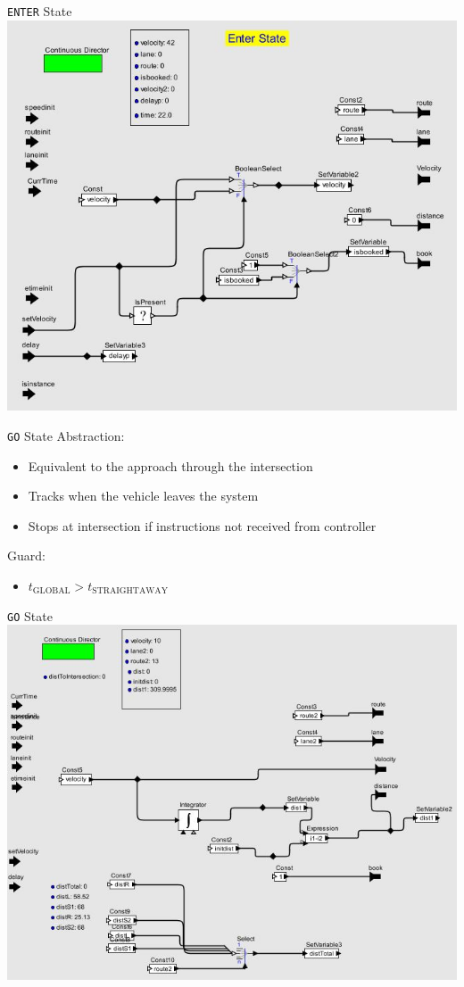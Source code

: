 \begin{frame}{\texttt{ENTER} State}
\centering\includegraphics[width=0.7\linewidth]{diagram/ptolemy_vehicle_enter.jpg}
\end{frame}

\begin{frame}{\texttt{GO} State}
Abstraction:
\begin{itemize}
\item Equivalent to the approach through the intersection
\item Tracks when the vehicle leaves the system
\item Stops at intersection if instructions not received from controller
\end{itemize}
Guard:
\begin{itemize}
\item $t_\text{GLOBAL} > t_\text{STRAIGHTAWAY}$
\end{itemize}
\end{frame}

\begin{frame}{\texttt{GO} State}
\centering\includegraphics[width=0.75\linewidth]{diagram/ptolemy_vehicle_go.jpg}
\end{frame}

